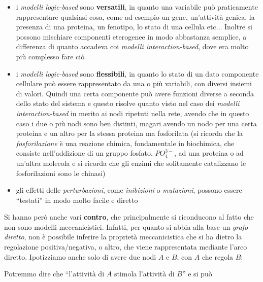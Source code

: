 \documentclass[a4paper,12pt, oneside]{book}
\begin{document}
\begin{itemize}
  \item i \textit{modelli logic-based} sono \textbf{versatili}, in quanto una
  variabile può praticamente rappresentare qualsiasi cosa, come ad esempio un
  gene, un'attività genica, la presenza di una proteina, un fenotipo, lo stato
  di una cellula etc$\ldots$ Inoltre si possono mischiare componenti eterogenee
  in modo abbastanza semplice, a differenza di quanto accadeva coi
  \textit{modelli interaction-based}, dove era molto più complesso fare ciò
  \item i \textit{modelli logic-based} sono \textbf{flessibili}, in quanto lo
  stato di un dato componente cellulare può essere rappresentato da una o più
  variabili, con diversi insiemi di valori. Quindi una certa componente può
  avere funzioni diverse a seconda dello stato del sistema e questo risolve
  quanto visto nel caso dei \textit{modelli interaction-based} in merito ai
  nodi ripetuti nella rete, avendo che in questo caso i due o più nodi sono
  ben distinti, magari avendo un nodo per una certa proteina e un altro per la
  stessa proteina ma fosforilata (si ricorda che la \textit{fosforilazione} è
  una reazione chimica, fondamentale in biochimica,  che consiste
  nell'addizione di un gruppo fosfato, $PO_4^{3-}$, ad una proteina o ad
  un'altra molecola e si ricorda che gli enzimi che solitamente catalizzano le
  fosforilazioni sono le chinasi)   
  \item gli effetti delle \textit{perturbazioni}, come \textit{inibizioni} o
  \textit{mutazioni}, possono essere ``testati'' in modo molto facile e diretto
\end{itemize}
Si hanno però anche vari \textbf{contro}, che principalmente si riconducono al
fatto che non sono modelli meccanicistici. Infatti, per quanto si abbia alla
base un \textit{grafo diretto}, non è possibile inferire la proprietà
meccanicistica che si ha dietro la regolazione positiva/negativa, o altro, che
viene rappresentata mediante l'arco diretto. Ipotizziamo anche solo di avere due
nodi $A$ e $B$, con $A$ che regola $B$:
\begin{center}
\end{center}
Potremmo dire che ``l'attività di $A$ stimola l'attività di $B$'' e si può
\end{document}

